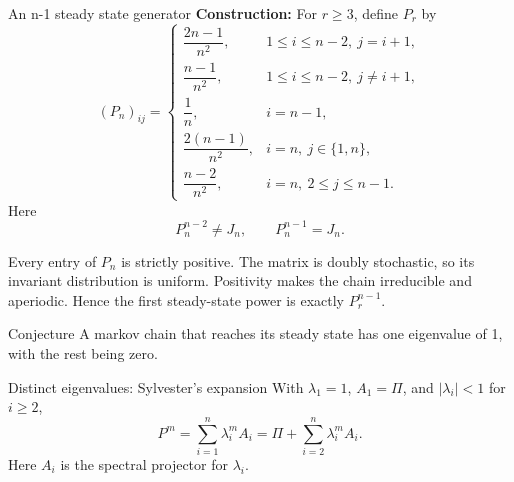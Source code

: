 \documentclass{beamer} %
\begin{document}
\begin{frame}{An n-1 steady state generator}
\textbf{Construction:} For $r \ge 3$, define $P_r$ by
\begin{equation}
(P_n)_{ij} = \begin{cases}
\dfrac{2n - 1}{n^2}, & 1 \le i \le n - 2, \ j = i + 1, \\[8pt]
\dfrac{n - 1}{n^2}, & 1 \le i \le n - 2, \ j \neq i + 1, \\[8pt]
\dfrac{1}{n}, & i = n- 1, \\[8pt]
\dfrac{2(n - 1)}{n^2}, & i = n, \ j \in \{1, n\}, \\[8pt]
\dfrac{n - 2}{n^2}, & i = n, \ 2 \le j \le n - 1.
\end{cases}
\end{equation}
Here
\[
P_n^{n-2} \neq J_n, \qquad P_n^{n-1} = J_n.
\]


Every entry of $P_n$ is strictly positive. The matrix is doubly stochastic, so its invariant distribution is uniform. Positivity makes the chain irreducible and aperiodic. Hence the first steady-state power is exactly $P_r^{n-1}$.

\end{frame}

\begin{frame}{}
    \begin{block}{Conjecture}
A markov chain that reaches its steady state has one eigenvalue of 1, with the rest being zero.  

\end{block}

 \begin{block}{Distinct eigenvalues: Sylvester's expansion}
With $\lambda_1=1$, $A_1=\Pi$, and
$|\lambda_i|<1$ for $i\ge2$,
\[
P^m=\sum_{i=1}^{n}\lambda_i^m A_i
   =\Pi+\sum_{i=2}^{n}\lambda_i^m A_i.
\]
Here $A_i$ is the spectral projector for $\lambda_i$.
\end{block}

\end{frame}
\end{document}
